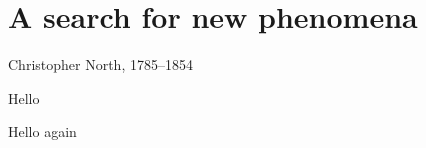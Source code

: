 \chapter{A search for new phenomena}
\label{chapter:2ljets}


%
{Christopher North, 1785--1854}%

Hello


\clearpage

Hello again
